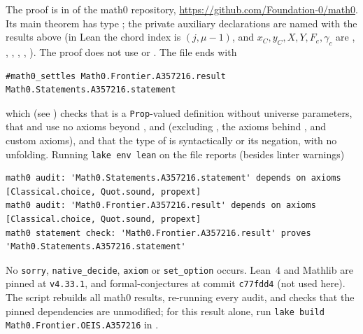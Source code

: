 \documentclass[11pt]{amsart}
\theoremstyle{plain}
\theoremstyle{definition}
\begin{document}
The proof is in  of the math0 repository, \url{https://github.com/Foundation-0/math0}. Its main theorem  has type ; the private auxiliary declarations are named with the results above (in Lean the chord index is $(j,\mu-1)$, and $x_C,y_C,X,Y,F_c,\gamma_c$ are , , , , , ). The proof does not use  or . The file ends with
\begin{lstlisting}
#math0_settles Math0.Frontier.A357216.result Math0.Statements.A357216.statement
\end{lstlisting}
which (see ) checks that  is a \texttt{Prop}-valued definition without universe parameters, that  and  use no axioms beyond ,  and  (excluding , the axioms behind , and custom axioms), and that the type of  is syntactically  or its negation, with no unfolding. Running \texttt{lake env lean} on the file reports (besides linter warnings)
\begin{lstlisting}[basicstyle=\ttfamily\scriptsize]
math0 audit: 'Math0.Statements.A357216.statement' depends on axioms [Classical.choice, Quot.sound, propext]
math0 audit: 'Math0.Frontier.A357216.result' depends on axioms [Classical.choice, Quot.sound, propext]
math0 statement check: 'Math0.Frontier.A357216.result' proves 'Math0.Statements.A357216.statement'
\end{lstlisting}
No \texttt{sorry}, \texttt{native\_decide}, \texttt{axiom} or \texttt{set\_option} occurs. Lean~4 \cite{Lean4} and Mathlib \cite{Mathlib} are pinned at \texttt{v4.33.1}, and formal-conjectures \cite{FC} at commit \texttt{c77fdd4} (not used here). The script  rebuilds all math0 results, re-running every audit, and checks that the pinned dependencies are unmodified; for this result alone, run \texttt{lake build Math0.Frontier.OEIS.A357216} in .
\end{document}
